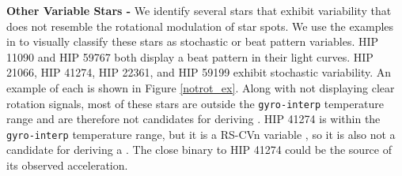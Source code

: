 {\bf Other Variable Stars - }We identify several stars that exhibit variability that does not resemble the rotational modulation of star spots. We use the examples in \cite{2013MNRAS.432.1203M} to visually classify these stars as stochastic or beat pattern variables. HIP 11090 and HIP 59767 both display a beat pattern in their light curves. HIP 21066, HIP 41274, HIP 22361, and HIP 59199 exhibit stochastic variability. An example of each is shown in Figure \ref{notrot_ex}. Along with not displaying clear rotation signals, most of these stars are outside the \texttt{gyro-interp} temperature range and are therefore not candidates for deriving . HIP 41274 is within the \texttt{gyro-interp} temperature range, but it is a RS-CVn variable \citep{2022MNRAS.512.4835M}, so it is also not a candidate for deriving a . The close binary to HIP 41274 could be the source of its observed acceleration.



